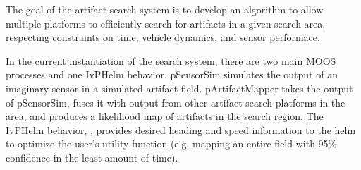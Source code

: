 The goal of the artifact search system is to develop an algorithm to allow multiple platforms to efficiently search for artifacts in a given search area, respecting constraints on time, vehicle dynamics, and sensor performace.

In the current instantiation of the search system, there are two main MOOS processes and one IvPHelm behavior.  pSensorSim simulates the output of an imaginary sensor in a simulated artifact field.  pArtifactMapper takes the output of pSensorSim, fuses it with output from other artifact search platforms in the area, and produces a likelihood map of artifacts in the search region.  The IvPHelm behavior, \bhvsg, provides desired heading and speed information to the helm to optimize the user's utility function (e.g. mapping an entire field with 95\% confidence in the least amount of time).
